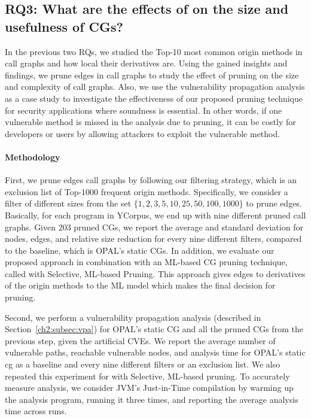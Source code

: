 \subsection{\textbf{RQ3}: What are the effects of  on the size and usefulness of CGs?}
In the previous two RQs, we studied the Top-10 most common origin methods in call graphs and how local their derivatives are. Using the gained insights and findings, we prune edges in call graphs to study the effect of pruning on the size and complexity of call graphs. Also, we use the vulnerability propagation analysis as a case study to investigate the effectiveness of our proposed pruning technique for security applications where soundness is essential. In other words, if one vulnerable method is missed in the analysis due to pruning, it can be costly for developers or users by allowing attackers to exploit the vulnerable method. 

\paragraph{Methodology}
First, we prune edges call graphs by following our filtering strategy, which is an exclusion list of Top-1000 frequent origin methods. Specifically, we consider a filter of different sizes from the set $\{1,2,3,5,10,25,50,100,1000\}$ to prune edges. Basically, for each program in YCorpus, we end up with nine different pruned call graphs. Given 203 pruned CGs, we report the average and standard deviation for nodes, edges, and relative size reduction for every nine different filters, compared to the baseline, which is OPAL's static CGs. In addition, we evaluate our proposed approach in combination with an ML-based CG pruning technique, called  with Selective, ML-based Pruning. This approach gives edges to derivatives of the origin methods to the ML model which makes the final decision for pruning.

Second, we perform a vulnerability propagation analysis (described in Section~\ref{ch2:subsec:vpa}) for OPAL's static CG and all the pruned CGs from the previous step, given the artificial CVEs. We report the average number of vulnerable paths, reachable vulnerable nodes, and analysis time for OPAL's static cg as a baseline and every nine different filters or an exclusion list. We also repeated this experiment for   with Selective, ML-based pruning. To accurately measure analysis, we consider JVM's Just-in-Time compilation by warming up the analysis program, running it three times, and reporting the average analysis time across runs. 

